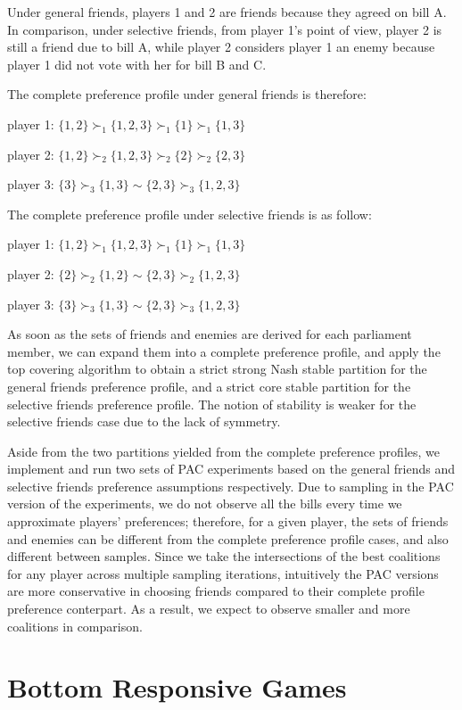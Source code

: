 Under general friends, players 1 and 2 are friends because they agreed on bill A.
In comparison, under selective friends, from player 1's point of view, player 2
is still a friend due to bill A, while player 2 considers player 1 an enemy
because player 1 did not vote with her for bill B and C.

The complete preference profile under general friends is therefore:

player 1: $\{1, 2\} \succ_1 \{1, 2, 3\} \succ_1 \{1\} \succ_1 \{1, 3\} $

player 2: $\{1, 2\} \succ_2 \{1, 2, 3\} \succ_2 \{2\} \succ_2 \{2, 3\}$

player 3: $\{3\} \succ_3 \{1, 3\} \sim \{2, 3\} \succ_3 \{1, 2, 3\}$

The complete preference profile under selective friends is as follow:

player 1: $\{1, 2\} \succ_1 \{1, 2, 3\} \succ_1 \{1\} \succ_1 \{1, 3\} $

player 2: $\{2\} \succ_2 \{1, 2\} \sim \{2, 3\} \succ_2 \{1, 2, 3\} $

player 3: $\{3\} \succ_3 \{1, 3\} \sim \{2, 3\} \succ_3 \{1, 2, 3\}$

As soon as the sets of friends and enemies are derived for each parliament member,
we can expand them into a complete preference profile, and apply the top covering
algorithm to obtain a strict strong Nash stable partition for the general friends
preference profile, and a strict core stable partition for the selective friends
preference profile. The notion of stability is weaker for the selective friends
case due to the lack of symmetry.

Aside from the two partitions yielded from the complete preference profiles,
we implement and run two sets of PAC experiments based on the general friends
and selective friends preference assumptions respectively.
Due to sampling in the PAC version of the experiments, we do not observe all
the bills every time we approximate players' preferences;
therefore, for a given player, the sets of friends and enemies can be different
from the complete preference profile cases, and also different between samples.
Since we take the intersections of the best coalitions for any player across
multiple sampling iterations, intuitively the PAC versions are more conservative
in choosing friends compared to their complete profile preference conterpart.
As a result, we expect to observe smaller and more coalitions in comparison.


\section{Bottom Responsive Games}
\label{sec:bottom_responsive_game}

